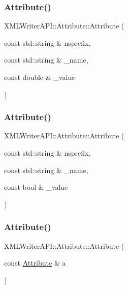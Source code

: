 \mbox{\label{classXMLWriterAPI_1_1Attribute_a501528e4f1a7b1cabeaf7cfc21c0b97d}} 
\subsubsection{\texorpdfstring{Attribute()}{Attribute()}\hspace{0.1cm}{\footnotesize\ttfamily [64/66]}}
{\footnotesize\ttfamily X\+M\+L\+Writer\+A\+P\+I\+::\+Attribute\+::\+Attribute (\begin{DoxyParamCaption}\item[{const std\+::string \&}]{nsprefix,  }\item[{const std\+::string \&}]{\+\_\+name,  }\item[{const double \&}]{\+\_\+value }\end{DoxyParamCaption})}

\mbox{\label{classXMLWriterAPI_1_1Attribute_ac570bd81cf851adca96d3b28eaa58c3e}} 
\subsubsection{\texorpdfstring{Attribute()}{Attribute()}\hspace{0.1cm}{\footnotesize\ttfamily [65/66]}}
{\footnotesize\ttfamily X\+M\+L\+Writer\+A\+P\+I\+::\+Attribute\+::\+Attribute (\begin{DoxyParamCaption}\item[{const std\+::string \&}]{nsprefix,  }\item[{const std\+::string \&}]{\+\_\+name,  }\item[{const bool \&}]{\+\_\+value }\end{DoxyParamCaption})}

\mbox{\label{classXMLWriterAPI_1_1Attribute_a44b71cf3ef8f67bb010561184f1678d1}} 
\subsubsection{\texorpdfstring{Attribute()}{Attribute()}\hspace{0.1cm}{\footnotesize\ttfamily [66/66]}}
{\footnotesize\ttfamily X\+M\+L\+Writer\+A\+P\+I\+::\+Attribute\+::\+Attribute (\begin{DoxyParamCaption}\item[{const \mbox{\hyperlink{classXMLWriterAPI_1_1Attribute}{Attribute}} \&}]{a }\end{DoxyParamCaption})}




